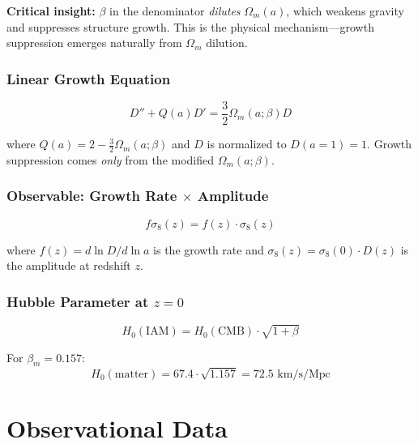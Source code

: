 \documentclass[11pt,letterpaper]{article}
\begin{document}
\noindent\textbf{Critical insight:} $\beta$ in the denominator \textit{dilutes} $\Omega_m(a)$, which weakens gravity and suppresses structure growth. This is the physical mechanism---growth suppression emerges naturally from $\Omega_m$ dilution.

\subsubsection{Linear Growth Equation}

\begin{equation}
D'' + Q(a) D' = \frac{3}{2} \Omega_m(a; \beta) D
\end{equation}

where $Q(a) = 2 - \frac{3}{2}\Omega_m(a; \beta)$ and $D$ is normalized to $D(a=1) = 1$. Growth suppression comes \textit{only} from the modified $\Omega_m(a; \beta)$.

\subsubsection{Observable: Growth Rate $\times$ Amplitude}

\begin{equation}
f\sigma_8(z) = f(z) \cdot \sigma_8(z)
\end{equation}

where $f(z) = d \ln D / d \ln a$ is the growth rate and $\sigma_8(z) = \sigma_8(0) \cdot D(z)$ is the amplitude at redshift $z$.

\subsubsection{Hubble Parameter at $z=0$}

\begin{equation}
H_0(\text{IAM}) = H_0(\text{CMB}) \cdot \sqrt{1 + \beta}
\end{equation}

For $\beta_m = 0.157$:
\begin{equation}
H_0(\text{matter}) = 67.4 \cdot \sqrt{1.157} = 72.5 \text{ km/s/Mpc}
\end{equation}

\section{Observational Data}
\end{document}
